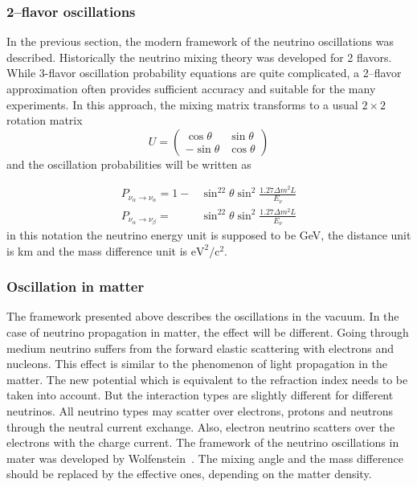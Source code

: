 \documentclass[../main.tex]{subfiles}
\begin{document}
\subsubsection{2--flavor oscillations}
In the previous section, the modern framework of the neutrino oscillations was described. Historically the neutrino mixing theory was developed for 2 flavors. While 3-flavor oscillation probability equations are quite complicated, a 2--flavor approximation often provides sufficient accuracy and suitable for the many experiments. In this approach, the mixing matrix transforms to a usual $2\times2$ rotation matrix
\begin{equation}
U=
\begin{pmatrix}
\cos\theta    & \sin\theta     \\
-\sin\theta   & \cos\theta
\end{pmatrix}
\end{equation}
and the oscillation probabilities will be written as

\begin{align}
P_{\nu_\alpha\to\nu_\alpha}=1-&\sin^22\theta\sin^2\frac{1.27\Delta m^2L}{E_\nu} \\
P_{\nu_\alpha\to\nu_\beta}=&\sin^22\theta\sin^2\frac{1.27\Delta m^2L}{E_\nu}
\end{align}
in this notation the neutrino energy unit is supposed to be GeV, the distance unit is km and the mass difference unit is $\text{eV}^2/\text{c}^2$.

\subsubsection{Oscillation in matter}
\label{sc:intro:mat}
The framework presented above describes the oscillations in the vacuum. In the case of neutrino propagation in matter, the effect will be different. Going through medium neutrino suffers from the forward elastic scattering with electrons and nucleons. This effect is similar to the phenomenon of light propagation in the matter. The new potential which is equivalent to the refraction index needs to be taken into account. But the interaction types are slightly different for different neutrinos. All neutrino types may scatter over electrons, protons and neutrons through the neutral current exchange. Also, electron neutrino scatters over the electrons with the charge current. The framework of the neutrino oscillations in mater was developed by Wolfenstein~\cite{Wolfenstein1978}. The mixing angle and the mass difference should be replaced by the effective ones, depending on the matter density.
\end{document}
